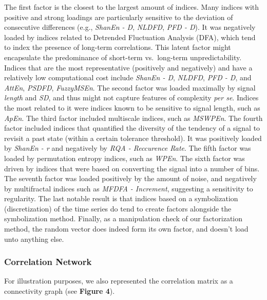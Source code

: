 \documentclass[
  man]{apa6}
\begin{document}
The first factor is the closest to the largest amount of indices. Many indices with positive and strong loadings are particularly sensitive to the deviation of consecutive differences (e.g., \emph{ShanEn - D}, \emph{NLDFD}, \emph{PFD - D}). It was negatively loaded by indices related to Detrended Fluctuation Analysis (DFA), which tend to index the presence of long-term correlations. This latent factor might encapsulate the predominance of short-term vs.~long-term unpredictability. Indices that are the most representative (positively and negatively) and have a relatively low computational cost include \emph{ShanEn - D}, \emph{NLDFD}, \emph{PFD - D}, and \emph{AttEn}, \emph{PSDFD}, \emph{FuzzyMSEn}. The second factor was loaded maximally by signal \emph{length} and \emph{SD}, and thus might not capture features of complexity \emph{per se}. Indices the most related to it were indices known to be sensitive to signal length, such as \emph{ApEn}. The third factor included multiscale indices, such as \emph{MSWPEn}. The fourth factor included indices that quantified the diversity of the tendency of a signal to revisit a past state (within a certain tolerance threshold). It was positively loaded by \emph{ShanEn - r} and negatively by \emph{RQA - Reccurence Rate}. The fifth factor was loaded by permutation entropy indices, such as \emph{WPEn}. The sixth factor was driven by indices that were based on converting the signal into a number of bins. The seventh factor was loaded positively by the amount of noise, and negatively by multifractal indices such as \emph{MFDFA - Increment}, suggesting a sensitivity to regularity. The last notable result is that indices based on a symbolization (discretization) of the time series do tend to create factors alongside the symbolization method. Finally, as a manipulation check of our factorization method, the random vector does indeed form its own factor, and doesn't load unto anything else.

\hypertarget{correlation-network}{%
\subsubsection{Correlation Network}\label{correlation-network}}

For illustration purposes, we also represented the correlation matrix as a connectivity graph (see \textbf{Figure 4}).
\end{document}
